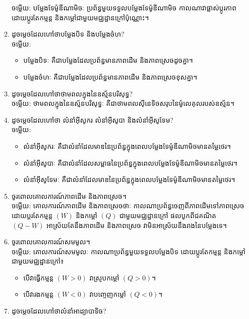 \documentclass{officialexam}
\begin{document}
\begin{enumerate}[m]
		{\color{red}\sffamily ចម្លើយ}: បម្លែងទែម៉ូឌីណាមិចៈ ប្រព័ន្ធមួយទទួលបម្លែងទែម៉ូឌីណាមិច កាលណាវាផ្លាស់ប្តូរភាពដោយប្តូរតែកម្មន្ត និងកម្តៅជាមួយមជ្ឈដ្ឋានក្រៅប៉ុណ្ណោះ។
		\item ដូចម្តេចដែលហៅថាបម្លែងបិទ និងបម្លែងចំហ?\\
		{\color{red}\sffamily ចម្លើយ}:
		\begin{itemize}
			\item បម្លែងបិទៈ គឺជាបម្លែងដែលប្រព័ន្ធមានភាពដើម និងភាពស្រេចដូចគ្នា។
			\item បម្លែងចំហៈ គឺជាបម្លែងដែលប្រព័ន្ធមានភាពដើម និងភាពស្រេចខុសគ្នា។
		\end{itemize}
		\item ដូចម្តេចដែលហៅថាថាមពលក្នុងនៃឧស្ម័នបរិសុទ្ធ?\\
		{\color{red}\sffamily ចម្លើយ}: ថាមពលក្នុងនៃឧស្ម័នបរិសុទ្ធៈ គឺជាថាមពលសុីនេទិចសរុបនៃម៉ូលេគុលរបស់ឧស្ម័ន។
		\item ដូចម្តេចដែលហៅថា លំនាំអុីសូករ លំនាំអុីសូបា​ និងលំនាំអុីសូទែម?\\
		{\color{red}\sffamily ចម្លើយ}:
		\begin{itemize}
			\item លំនាំអុីសូករៈ គឺជាលំនាំដែលមាឌនៃប្រព័ន្ធក្នុងពេលបម្លែងទែម៉ូឌីណាមិចមានតម្លៃថេរ។
			\item លំនាំអុីសូបាៈ គឺជាលំនាំដែលសម្ពាធនៃប្រព័ន្ធក្នុងពេលបម្លែងទែម៉ូឌីណាមិចមានតម្លៃថេរ។
			\item លំនាំអុីសូទែមៈ គឺជាលំនាំដែលមាឌនៃប្រព័ន្ធក្នុងពេលបម្លែងទែម៉ូឌីណាមិចមានតម្លៃថេរ។
		\end{itemize}
		\item ចូរពោលគោលការណ៍ភាពដើម និងភាពស្រេច។\\
		{\color{red}\sffamily ចម្លើយ}: គោលការណ៍ភាពដើម និងភាពស្រេចថាៈ កាលណាប្រព័ន្ធចេញពីភាពដើមទៅភាពស្រេច ដោយប្តរតែកម្មន្ត $\left(W\right)$ និងកម្តៅ $\left(Q\right)$ ជាមួយមជ្ឈដ្ឋានក្រៅ ផលបូកពីជគណិត $\left(Q-W\right)$ អាស្រ័យតែនឹងភាពដើម និងភាពស្រេច វាមិនអាស្រ័យនឹងរាងនៃបម្លែងទេ។
		\item ចូរពោលគោលការណ៍សមមូល។\\
		{\color{red}\sffamily ចម្លើយ}: គោលការណ៍សមមូលៈ កាលណាប្រព័ន្ធមួយទទួលបម្លែងបិទ ដោយប្តូរតែកម្មន្ត និងកម្តៅជាមួយមជ្ឈដ្ឋានក្រៅ៖ 
		\begin{itemize}
			\item បើវាធ្វើកម្មន្ត $\left(W>0\right)$ វាស្រូបកម្តៅ $\left(Q>0\right)$។
			\item បើវារងកម្មន្ត $\left(W<0\right)$ វាបញ្ចេញកម្តៅ $\left(Q<0\right)$។
		\end{itemize}
		\item ដូចម្តេចដែលហៅថាលំនាំអាដ្យាបាទិច?

\end{enumerate}
\end{document}

